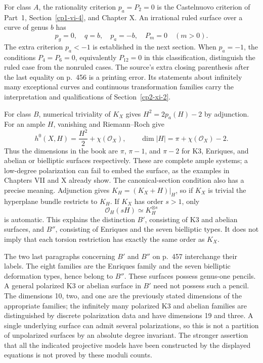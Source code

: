 For class \(A\), the rationality criterion \(p_a=P_2=0\) is the Castelnuovo criterion of Part~1, Section~\ref{cp1-vi-4}, and Chapter X. An irrational ruled surface over a curve of genus \(b\) has
\[
p_g=0,\quad q=b,\quad p_a=-b,\quad P_m=0\quad(m>0).
\]
The extra criterion \(p_a<-1\) is established in the next section. When \(p_a=-1\), the conditions \(P_4=P_6=0\), equivalently \(P_{12}=0\) in this classification, distinguish the ruled case from the nonruled cases. The source's extra closing parenthesis after the last equality on p.~456 is a printing error. Its statements about infinitely many exceptional curves and continuous transformation families carry the interpretation and qualifications of Section~\ref{cp2-xi-2}.

For class \(B\), numerical triviality of \(K_X\) gives \(H^2=2p_a(H)-2\) by adjunction. For an ample \(H\), vanishing and Riemann--Roch give
\[
h^0(X,H)=\frac{H^2}{2}+\chi(\mathcal O_X),\qquad
\dim|H|=\pi+\chi(\mathcal O_X)-2.
\]
Thus the dimensions in the book are \(\pi\), \(\pi-1\), and \(\pi-2\) for K3, Enriques, and abelian or bielliptic surfaces respectively. These are complete ample systems; a low-degree polarization can fail to embed the surface, as the examples in Chapters VII and X already show. The canonical-section condition also has a precise meaning. Adjunction gives \(K_H=(K_X+H)|_H\), so if \(K_X\) is trivial the hyperplane bundle restricts to \(K_H\). If \(K_X\) has order \(s>1\), only
\[
\mathcal O_H(sH)\simeq K_H^{\otimes s}
\]
is automatic. This explains the distinction \(B'\), consisting of K3 and abelian surfaces, and \(B''\), consisting of Enriques and the seven bielliptic types. It does not imply that each torsion restriction has exactly the same order as \(K_X\).

The two last paragraphs concerning \(B'\) and \(B''\) on p.~457 interchange their labels. The eight families are the Enriques family and the seven bielliptic deformation types, hence belong to \(B''\). These surfaces possess genus-one pencils. A general polarized K3 or abelian surface in \(B'\) need not possess such a pencil. The dimensions 10, two, and one are the previously stated dimensions of the appropriate families; the infinitely many polarized K3 and abelian families are distinguished by discrete polarization data and have dimensions 19 and three. A single underlying surface can admit several polarizations, so this is not a partition of unpolarized surfaces by an absolute degree invariant. The stronger assertion that all the indicated projective models have been constructed by the displayed equations is not proved by these moduli counts.

